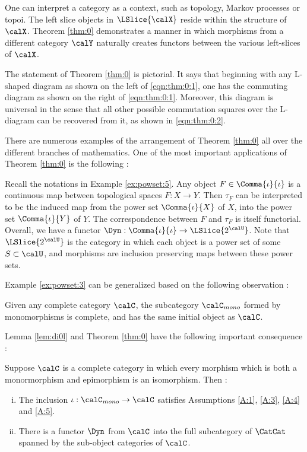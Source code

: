 \documentclass[12pt,oneside]{article}
\begin{document}
One can interpret a category as a context, such as topology, Markov processes or topoi. The left slice objects in $\LSlice{ \calX }$ reside within the structure of $\calX$. Theorem \ref{thm:0} demonstrates a manner in which morphisms from a different category $\calY$ naturally creates functors between the various left-slices of $\calX$. 

The statement of Theorem \ref{thm:0} is pictorial. It says that beginning with any L-shaped diagram as shown on the left of \eqref{eqn:thm:0:1}, one has the commuting diagram as shown on the right of \eqref{eqn:thm:0:1}. Moreover, this diagram is universal in the sense that all other possible commutation squares over the L-diagram can be recovered from it, as shown in  \eqref{eqn:thm:0:2}. 


There are numerous examples of the arrangement of Theorem \ref{thm:0} all over the different branches of mathematics. One of the most important applications of Theorem \ref{thm:0} is the following : 

\begin{example} \label{ex:powset:3}
	Recall the notations in Example \ref{ex:powset:5}. Any object $F\in \Comma{\iota}{\iota}$ is a continuous map between topological spaces $F:X\to Y$. Then $\tau_F$ can be interpreted to be the induced map from the power set $\Comma{\iota}{X}$ of $X$, into the power set $\Comma{\iota}{Y}$ of $Y$. The correspondence between $F$ and $\tau_F$ is itself functorial. Overall, we have a functor $\Dyn : \Comma{\iota}{\iota} \to \LSlice{ 2^{\calU} }$. Note that $\LSlice{ 2^{\calU} }$ is the category in which each object is a power set of some $S\subset \calU$, and morphisms are inclusion preserving maps between these power sets.
\end{example}

Example \ref{ex:powset:3} can be generalized based on the following observation : 

\begin{lemma} \label{lem:di0l}
	Given any complete category $\calC$, the subcategory $\calC_{mono}$ formed by monomorphisms is complete, and has the same initial object as $\calC$.
\end{lemma}

Lemma \ref{lem:di0l} and Theorem \ref{thm:0} have the following important consequence : 

\begin{corollary} \label{corr:5}
	Suppose $\calC$ is a complete category in which every morphism which is both a monormorphism  and epimorphism is an isomorphism. Then :
	\begin{enumerate} [(i)]
		\item The inclusion $\iota : \calC_{mono} \to \calC$ satisfies Assumptions \ref{A:1}, \ref{A:3}, \ref{A:4} and \ref{A:5}.
		\item There is a functor $\Dyn$ from $\calC$ into the full subcategory of $\CatCat$ spanned by the sub-object categories of $\calC$.
	\end{enumerate}
\end{corollary}
\end{document}
